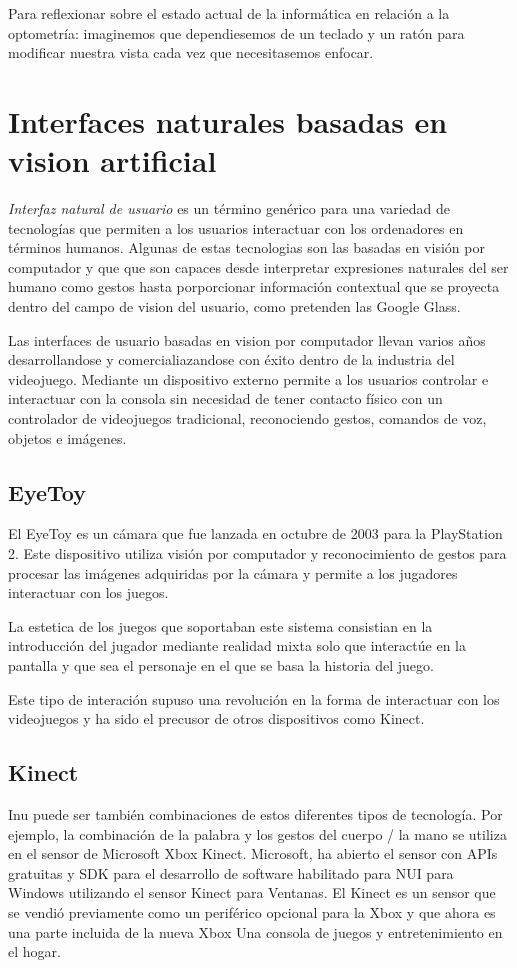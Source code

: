 Para reflexionar sobre el estado actual de la informática en relación a la optometría: imaginemos que dependiesemos de un teclado y un ratón para modificar nuestra vista cada vez que necesitasemos enfocar.

\section{Interfaces naturales basadas en vision artificial}
\emph{Interfaz natural de usuario} es un término genérico para una variedad de tecnologías que permiten a los usuarios interactuar con los ordenadores en términos humanos. Algunas de estas tecnologias son las basadas en visión por computador y que que son capaces desde interpretar expresiones naturales del ser humano como gestos hasta porporcionar información contextual que se proyecta dentro del campo de vision del usuario, como pretenden las Google Glass. 

Las interfaces de usuario basadas en vision por computador llevan varios años desarrollandose y comercialiazandose con éxito dentro de la industria del videojuego. Mediante un dispositivo externo permite a los usuarios controlar e interactuar con la consola sin necesidad de tener contacto físico con un controlador de videojuegos tradicional, reconociendo gestos, comandos de voz, objetos e imágenes.

\subsection{EyeToy}
El EyeToy es un cámara que fue lanzada en octubre de 2003 para la PlayStation 2. Este dispositivo utiliza visión por computador y reconocimiento de gestos para procesar las imágenes adquiridas por la cámara y permite a los jugadores interactuar con los juegos.

La estetica de los juegos que soportaban este sistema consistian en la introducción del jugador mediante realidad mixta solo que interactúe en la pantalla y que sea el personaje en el que se basa la historia del juego. 

Este tipo de interación supuso una revolución en la forma de interactuar con los videojuegos y ha sido el precusor de otros dispositivos como Kinect.

\subsection{Kinect}
Inu puede ser también combinaciones de estos diferentes tipos de tecnología. Por ejemplo, la combinación de la palabra y los gestos del cuerpo / la mano se utiliza en el sensor de Microsoft Xbox Kinect. Microsoft, ha abierto el sensor con APIs gratuitas y SDK para el desarrollo de software habilitado para NUI para Windows utilizando el sensor Kinect para Ventanas. El Kinect es un sensor que se vendió previamente como un periférico opcional para la Xbox y que ahora es una parte incluida de la nueva Xbox Una consola de juegos y entretenimiento en el hogar.

